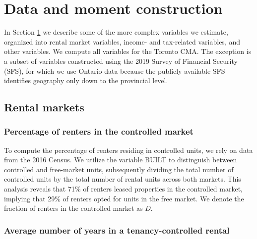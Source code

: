 \appendix
\setcounter{equation}{0}
\renewcommand{\theequation}{\thesection.\arabic{equation}}
\setcounter{page}{1}

\vspace{-3cm}

\section{Data and moment construction}\label{appendix:data}

In Section \ref{appendix:data} we describe some of the more complex variables we estimate, organized into rental market variables, income- and tax-related variables, and other variables. We compute all variables for the Toronto CMA. The exception is a subset of variables constructed using the 2019 Survey of Financial Security (SFS), for which we use Ontario data because the publicly available SFS identifies geography only down to the provincial level.

\subsection{Rental markets}\label{appendix:rental_markets}

\subsubsection{Percentage of renters in the controlled market}

To compute the percentage of renters residing in controlled units, we rely on data from the 2016 Census. We utilize the variable BUILT to distinguish between controlled and free-market units, subsequently dividing the total number of controlled units by the total number of rental units across both markets. This analysis reveals that 71\% of renters leased properties in the controlled market, implying that 29\% of renters opted for units in the free market. We denote the fraction of renters in the controlled market as $D$.

\subsubsection{Average number of years in a tenancy-controlled rental}


